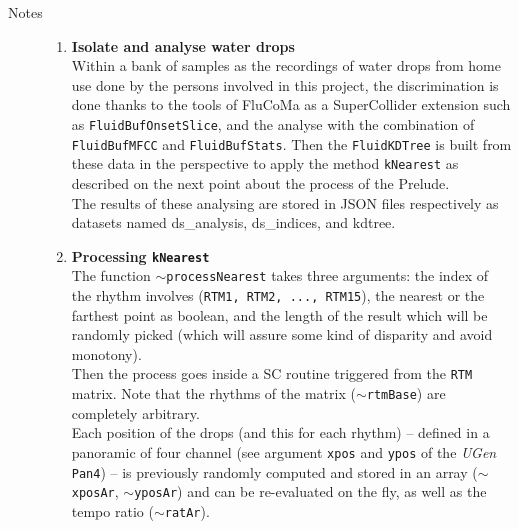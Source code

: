 \begin{description}
\item[Notes] \hfill 
\begin{enumerate}[label=\alph*)]
\item \textbf{Isolate and analyse water drops}\\ 
Within a bank of samples as the recordings of water drops from home use done by the persons involved in this project, the discrimination is done thanks to the tools of FluCoMa as a SuperCollider extension such as \texttt{FluidBufOnsetSlice}, and the analyse with the combination of  \texttt{FluidBufMFCC} and  \texttt{FluidBufStats}. Then the  \texttt{FluidKDTree} is built from these data in the perspective to apply the method  \texttt{kNearest} as described on the next point about the process of the Prelude.\\ 
The results of these analysing are stored in JSON files respectively as datasets named \textsf{ds\_analysis},  \textsf{ds\_indices}, and \textsf{kdtree}.
\item \textbf{Processing \texttt{kNearest}}\\ 
The function \texttt{$\sim$processNearest} takes three arguments: the index of the rhythm involves (\texttt{RTM1, RTM2, ..., RTM15}), the nearest or the farthest point as boolean, and the length of the result which will be randomly picked (which will assure some kind of disparity and avoid monotony).\\ 
 Then the process goes inside a SC routine triggered from the \texttt{RTM} matrix. Note that the rhythms of the matrix (\texttt{$\sim$rtmBase}) are completely arbitrary.\\ 
 Each position of the drops (and this for each rhythm) -- defined in a panoramic of four channel (see argument \texttt{xpos} and \texttt{ypos} of the \textit{UGen} \texttt{Pan4}) -- is previously randomly computed and stored in an array (\texttt{$\sim$xposAr}, \texttt{$\sim$yposAr}) and can be re-evaluated on the fly, as well as the tempo ratio (\texttt{$\sim$ratAr}).
\end{enumerate}
\end{description}

